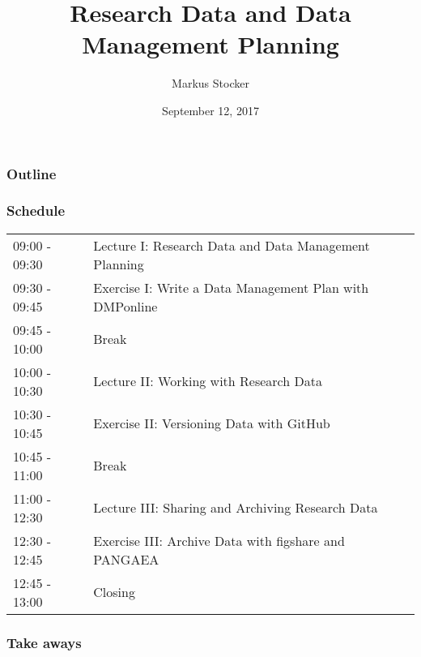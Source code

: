 \documentclass{beamer}
\title{Research Data and Data Management Planning}
\author{Markus Stocker}
\date{September 12, 2017}
\begin{document}
\maketitle

\begin{frame}
  \frametitle{Outline}
  
\end{frame}

\begin{frame}
  \frametitle{Schedule}
  
  \begin{center}
  \begin{tabular}{ll}
09:00 - 09:30 & Lecture I: Research Data and Data Management Planning \\
09:30 - 09:45 & Exercise I: Write a Data Management Plan with DMPonline \\ 
09:45 - 10:00 & Break \\
10:00 - 10:30 & Lecture II: Working with Research Data \\
10:30 - 10:45 & Exercise II: Versioning Data with GitHub \\
10:45 - 11:00 & Break \\
11:00 - 12:30 & Lecture III: Sharing and Archiving Research Data \\
12:30 - 12:45 & Exercise III: Archive Data with figshare and PANGAEA \\
12:45 - 13:00 & Closing \\
  \end{tabular}
  \end{center}
\end{frame}

\begin{frame}
  \frametitle{Take aways}
  
\end{frame}
\end{document}
